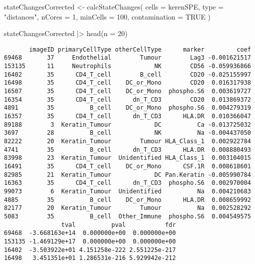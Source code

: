 \documentclass[
  letterpaper,
  DIV=11,
  numbers=noendperiod]{scrreprt}
\newenvironment{Shaded}{\begin{snugshade}}{\end{snugshade}}
\newcommand{\AttributeTok}[1]{\textcolor[rgb]{0.40,0.45,0.13}{#1}}
\newcommand{\ConstantTok}[1]{\textcolor[rgb]{0.56,0.35,0.01}{#1}}
\newcommand{\DecValTok}[1]{\textcolor[rgb]{0.68,0.00,0.00}{#1}}
\newcommand{\FunctionTok}[1]{\textcolor[rgb]{0.28,0.35,0.67}{#1}}
\newcommand{\NormalTok}[1]{\textcolor[rgb]{0.00,0.23,0.31}{#1}}
\newcommand{\OtherTok}[1]{\textcolor[rgb]{0.00,0.23,0.31}{#1}}
\newcommand{\SpecialCharTok}[1]{\textcolor[rgb]{0.37,0.37,0.37}{#1}}
\newcommand{\StringTok}[1]{\textcolor[rgb]{0.13,0.47,0.30}{#1}}
\begin{document}
\begin{Shaded}
\begin{Highlighting}[]
\NormalTok{stateChangesCorrected }\OtherTok{\textless{}{-}} \FunctionTok{calcStateChanges}\NormalTok{(}
  \AttributeTok{cells =}\NormalTok{ kerenSPE,}
  \AttributeTok{type =} \StringTok{"distances"}\NormalTok{,}
  \AttributeTok{nCores =} \DecValTok{1}\NormalTok{,}
  \AttributeTok{minCells =} \DecValTok{100}\NormalTok{,}
  \AttributeTok{contamination =} \ConstantTok{TRUE}
\NormalTok{)}

\NormalTok{stateChangesCorrected }\SpecialCharTok{|\textgreater{}} \FunctionTok{head}\NormalTok{(}\AttributeTok{n =} \DecValTok{20}\NormalTok{)}
\end{Highlighting}
\end{Shaded}

\begin{verbatim}
       imageID primaryCellType otherCellType      marker         coef
69468       37     Endothelial        Tumour        Lag3 -0.001621517
153135      11     Neutrophils            NK        CD56 -0.059936866
16402       35      CD4_T_cell        B_cell        CD20 -0.025155997
16498       35      CD4_T_cell    DC_or_Mono        CD20  0.016317938
16507       35      CD4_T_cell    DC_or_Mono  phospho.S6  0.003619727
16354       35      CD4_T_cell      dn_T_CD3        CD20  0.013869372
4891        35          B_cell    DC_or_Mono  phospho.S6  0.004279319
16357       35      CD4_T_cell      dn_T_CD3      HLA.DR  0.010366047
89188        3  Keratin_Tumour            DC          Ca -0.013725032
3697        28          B_cell            NK          Na -0.004437050
82222       20  Keratin_Tumour        Tumour HLA_Class_1  0.002922784
4741        35          B_cell      dn_T_CD3      HLA.DR  0.008880493
83998       23  Keratin_Tumour  Unidentified HLA_Class_1  0.003104015
16491       35      CD4_T_cell    DC_or_Mono      CSF.1R  0.008618601
82985       21  Keratin_Tumour            DC Pan.Keratin -0.005990784
16363       35      CD4_T_cell      dn_T_CD3  phospho.S6  0.002970004
99073        6  Keratin_Tumour  Unidentified          Na  0.004210683
4885        35          B_cell    DC_or_Mono      HLA.DR  0.008659992
82177       20  Keratin_Tumour        Tumour          Na  0.002528292
5083        35          B_cell  Other_Immune  phospho.S6  0.004549575
                tval          pval           fdr
69468  -3.668163e+14  0.000000e+00  0.000000e+00
153135 -1.469129e+17  0.000000e+00  0.000000e+00
16402  -3.503922e+01 4.151258e-222 2.551225e-217
16498   3.451351e+01 1.286531e-216 5.929942e-212

\end{verbatim}
\end{document}
